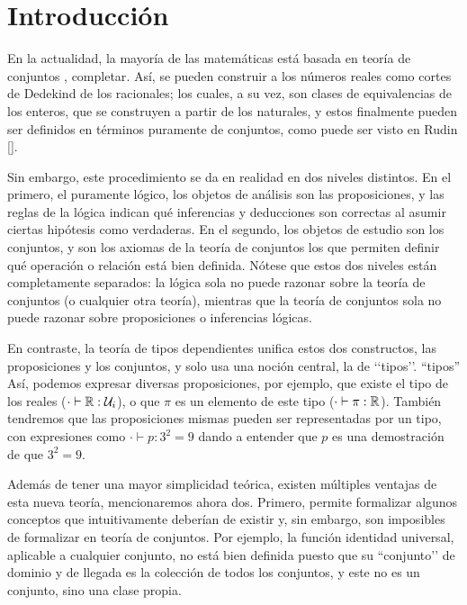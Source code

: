 \documentclass[../main.tex]{subfiles}
\begin{document}
\section{Introducción}
En la actualidad, la mayoría de las matemáticas está basada en teoría de conjuntos \cite{cantor_uber_1874}, {\color{red} completar}.
Así, se pueden construir a los n\'umeros reales como cortes de Dedekind de los racionales; los cuales, a su vez, son clases de equivalencias de los enteros, que se construyen a partir de los naturales, y estos finalmente pueden ser definidos en términos puramente de conjuntos,{\color{red} como puede ser visto en Rudin []}.

Sin embargo, este procedimiento se da en realidad en dos niveles distintos.
En el primero, el puramente l\'ogico, los objetos de análisis son las proposiciones, y las reglas de la lógica indican qué inferencias y deducciones son correctas {\color{red} al asumir} ciertas hipótesis {\color{red} como verdaderas}.
En el segundo, los objetos de estudio son los conjuntos, y son los axiomas de la teoría de conjuntos los que permiten definir qué operación o relación está bien definida.
Nótese que estos dos niveles están completamente separados: la lógica sola no puede razonar sobre la teoría de conjuntos (o cualquier otra teoría), mientras que la teoría de conjuntos sola no puede razonar sobre proposiciones o inferencias lógicas.

En contraste, la teoría de tipos dependientes unifica estos dos constructos, las proposiciones y los conjuntos, y solo usa una noción central, la de \lq\lq tipos\rq\rq. ``tipos''
Así, podemos expresar diversas proposiciones, por ejemplo, que existe el tipo de los reales ($\cdot \vdash \mathbb{R} : \mathcal U_i$), o que $\pi$ es un elemento de este tipo ($\cdot \vdash \pi :\mathbb{R}$).
También tendremos que las proposiciones mismas pueden ser representadas por un tipo, con expresiones como $\cdot \vdash p : 3^2=9$ dando a entender que $p$ es una demostración de que $3^2=9$.

Además de tener una mayor simplicidad teórica, existen múltiples ventajas de esta nueva teoría, mencionaremos ahora dos. Primero, permite formalizar algunos conceptos que intuitivamente deberían de existir y, sin embargo, son imposibles de formalizar en teoría de conjuntos.
Por ejemplo, la función identidad universal, aplicable a cualquier conjunto, no está bien definida puesto que su ``conjunto’’ de dominio y de llegada es la colección de todos los conjuntos, y este no es un conjunto, sino una clase propia.
\end{document}
